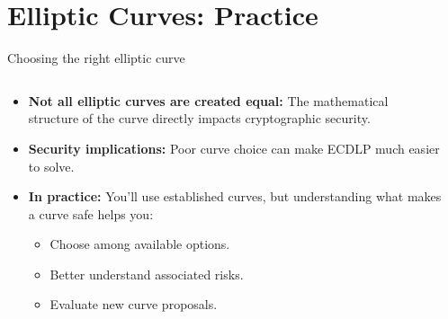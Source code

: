 \documentclass[aspectratio=169, lualatex, handout]{beamer}
\begin{document}
\section{Elliptic Curves: Practice}

\begin{frame}{Choosing the right elliptic curve}
	\begin{columns}[c]
		\begin{column}{0.5\textwidth}
			\begin{itemize}
				\item \textbf{Not all elliptic curves are created equal:} The mathematical structure of the curve directly impacts cryptographic security.
				\item \textbf{Security implications:} Poor curve choice can make ECDLP much easier to solve.
				\item \textbf{In practice:} You'll use established curves, but understanding what makes a curve safe helps you:
				      \begin{itemize}
					      \item Choose among available options.
					      \item Better understand associated risks.
					      \item Evaluate new curve proposals.
				      \end{itemize}
			\end{itemize}
		\end{column}
		\begin{column}{0.5\textwidth}
		\end{column}
	\end{columns}
\end{frame}
\end{document}
